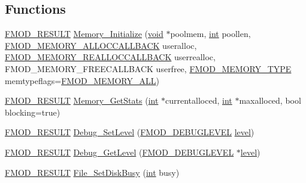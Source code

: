 \subsection*{Functions}
\begin{DoxyCompactItemize}
\item 
\hyperlink{fmod_8h_ae6ddadf8cb315e93ae7e6456b19db276}{F\-M\-O\-D\-\_\-\-R\-E\-S\-U\-L\-T} \hyperlink{namespace_f_m_o_d_a512b0025782c3b55d8cb8e5a6a03e420}{Memory\-\_\-\-Initialize} (\hyperlink{wglew_8h_aeea6e3dfae3acf232096f57d2d57f084}{void} $\ast$poolmem, \hyperlink{wglew_8h_a500a82aecba06f4550f6849b8099ca21}{int} poollen, \hyperlink{fmod_8h_a1c3d180ab9b661dc2f9b5a17f2228ef2}{F\-M\-O\-D\-\_\-\-M\-E\-M\-O\-R\-Y\-\_\-\-A\-L\-L\-O\-C\-C\-A\-L\-L\-B\-A\-C\-K} useralloc, \hyperlink{fmod_8h_a7fa695342268983a7021f31b73e9c81d}{F\-M\-O\-D\-\_\-\-M\-E\-M\-O\-R\-Y\-\_\-\-R\-E\-A\-L\-L\-O\-C\-C\-A\-L\-L\-B\-A\-C\-K} userrealloc, F\-M\-O\-D\-\_\-\-M\-E\-M\-O\-R\-Y\-\_\-\-F\-R\-E\-E\-C\-A\-L\-L\-B\-A\-C\-K userfree, \hyperlink{fmod_8h_a44d405faf88cf3daaaedc04995c4dd2e}{F\-M\-O\-D\-\_\-\-M\-E\-M\-O\-R\-Y\-\_\-\-T\-Y\-P\-E} memtypeflags=\hyperlink{fmod_8h_a54c1bd5da84bd97314f347ab10d9205b}{F\-M\-O\-D\-\_\-\-M\-E\-M\-O\-R\-Y\-\_\-\-A\-L\-L})
\item 
\hyperlink{fmod_8h_ae6ddadf8cb315e93ae7e6456b19db276}{F\-M\-O\-D\-\_\-\-R\-E\-S\-U\-L\-T} \hyperlink{namespace_f_m_o_d_ac79c05bcf1dd34fd44ec761cde32d4ed}{Memory\-\_\-\-Get\-Stats} (\hyperlink{wglew_8h_a500a82aecba06f4550f6849b8099ca21}{int} $\ast$currentalloced, \hyperlink{wglew_8h_a500a82aecba06f4550f6849b8099ca21}{int} $\ast$maxalloced, bool blocking=true)
\item 
\hyperlink{fmod_8h_ae6ddadf8cb315e93ae7e6456b19db276}{F\-M\-O\-D\-\_\-\-R\-E\-S\-U\-L\-T} \hyperlink{namespace_f_m_o_d_a7869d42e8497be60ed7509f24251b826}{Debug\-\_\-\-Set\-Level} (\hyperlink{fmod_8h_a767f8e8b1220d31e69037a3207c0ac87}{F\-M\-O\-D\-\_\-\-D\-E\-B\-U\-G\-L\-E\-V\-E\-L} \hyperlink{glew_8h_a2b536fca24f51d6a849aed325793e661}{level})
\item 
\hyperlink{fmod_8h_ae6ddadf8cb315e93ae7e6456b19db276}{F\-M\-O\-D\-\_\-\-R\-E\-S\-U\-L\-T} \hyperlink{namespace_f_m_o_d_a4883ada84265856174996489dbca058d}{Debug\-\_\-\-Get\-Level} (\hyperlink{fmod_8h_a767f8e8b1220d31e69037a3207c0ac87}{F\-M\-O\-D\-\_\-\-D\-E\-B\-U\-G\-L\-E\-V\-E\-L} $\ast$\hyperlink{glew_8h_a2b536fca24f51d6a849aed325793e661}{level})
\item 
\hyperlink{fmod_8h_ae6ddadf8cb315e93ae7e6456b19db276}{F\-M\-O\-D\-\_\-\-R\-E\-S\-U\-L\-T} \hyperlink{namespace_f_m_o_d_a8bf90135b588a7cd7743660af2bd7f49}{File\-\_\-\-Set\-Disk\-Busy} (\hyperlink{wglew_8h_a500a82aecba06f4550f6849b8099ca21}{int} busy)

\end{DoxyCompactItemize}
